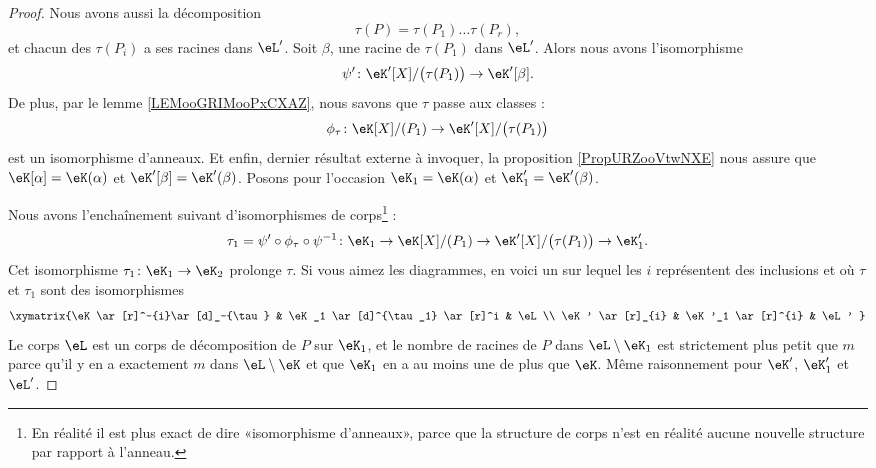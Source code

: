 \begin{proof}
    Nous avons aussi la décomposition
    \begin{equation}
        \tau(P)=\tau(P_1)\ldots \tau(P_r),
    \end{equation}
    et chacun des \( \tau(P_i)\) a ses racines dans \( \eL'\). Soit \( \beta\), une racine de \( \tau(P_1)\) dans \( \eL'\). Alors nous avons l'isomorphisme
    \begin{equation}
        \psi'\colon \eK'[X]/\big( \tau(P_1) \big)\to \eK'[\beta].
    \end{equation}
    De plus, par le lemme \ref{LEMooGRIMooPxCXAZ}, nous savons que \( \tau\) passe aux classes :
    \begin{equation}
        \phi_{\tau}\colon \eK[X]/(P_1)\to \eK'[X]/\big( \tau(P_1) \big)
    \end{equation}
    est un isomorphisme d'anneaux. Et enfin, dernier résultat externe à invoquer, la proposition \ref{PropURZooVtwNXE} nous assure que \( \eK[\alpha]=\eK(\alpha)\) et \( \eK'[\beta]=\eK'(\beta)\). Posons pour l'occasion \( \eK_1=\eK(\alpha)\) et \( \eK'_1=\eK'(\beta)\).

    Nous avons l'enchaînement suivant d'isomorphismes de corps\footnote{En réalité il est plus exact de dire «isomorphisme d'anneaux», parce que la structure de corps n'est en réalité aucune nouvelle structure par rapport à l'anneau.} :
    \begin{equation}
        \tau_1=\psi'\circ\phi_{\tau}\circ\psi^{-1} \colon \eK_1\to \eK[X]/(P_1)\to\eK'[X]/\big( \tau(P_1) \big)\to \eK'_1.
    \end{equation}
    Cet isomorphisme \( \tau_1\colon \eK_1\to \eK_2\) prolonge \( \tau\). Si vous aimez les diagrammes, en voici un sur lequel les \( i\) représentent des inclusions et où \( \tau\) et \( \tau_1\) sont des isomorphismes
    \begin{equation}
        \xymatrix{%
            \eK \ar[r]^-{i}\ar[d]_-{\tau}       &   \eK_1   \ar[d]^{\tau_1} \ar[r]^i    &   \eL\\
            \eK' \ar[r]_{i}                     &   \eK'_1  \ar[r]^{i}                  &   \eL'
        }
    \end{equation}
    Le corps \( \eL\) est un corps de décomposition de \( P\) sur \( \eK_1\), et le nombre de racines de \( P\) dans \( \eL\setminus\eK_1\) est strictement plus petit que \( m\) parce qu'il y en a exactement \( m\) dans \( \eL\setminus \eK\) et que \( \eK_1\) en a au moins une de plus que \( \eK\). Même raisonnement pour \( \eK'\), \( \eK'_1\) et \( \eL'\).


\end{proof}
